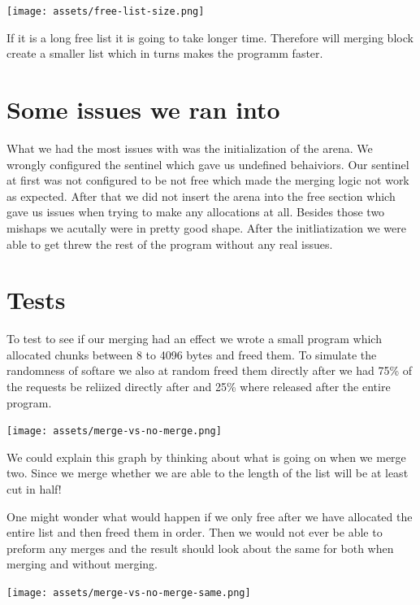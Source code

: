 \documentclass{article}
\begin{document}
\begin{center}
    \texttt{[image: assets/free-list-size.png]}
\end{center}

If it is a long free list it is going to take longer time. Therefore will merging block create a smaller list which in turns makes the programm faster.


\section{Some issues we ran into}

What we had the most issues with was the initialization of the arena. We wrongly configured the sentinel which gave us undefined behaiviors. Our sentinel at first was not configured to be not free which made the merging logic not work as expected. After that we did not insert the arena into the free section which gave us issues when trying to make any allocations at all. Besides those two mishaps we acutally were in pretty good shape. After the initliatization we were able to get threw the rest of the program without any real issues.



\section{Tests}

To test to see if our merging had an effect we wrote a small program which allocated chunks between 8 to 4096 bytes and freed them. To simulate the randomness of softare we also at random freed them directly after we had 75\% of the requests be reliized directly after and 25\% where released after the entire program.

\begin{center}
    \texttt{[image: assets/merge-vs-no-merge.png]}
\end{center}

We could explain this graph by thinking about what is going on when we merge two. Since we merge whether we are able to the length of the list will be at least cut in half!

One might wonder what would happen if we only free after we have allocated the entire list and then freed them in order. Then we would not ever be able to preform any merges and the result should look about the same for both when merging and without merging.

\begin{center}
    \texttt{[image: assets/merge-vs-no-merge-same.png]}
\end{center}
\end{document}
